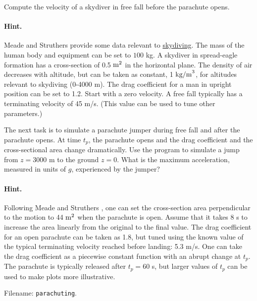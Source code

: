 \documentclass[graybox,sectrefs,envcountresetchap,open=right,final]{svmonodo}
\newenvironment{doconceexercise}{}{}
\begin{document}
\begin{doconceexercise}

Compute the velocity of
a skydiver in free fall before the parachute opens.


\paragraph{Hint.}
Meade and Struthers \cite{parachute_1999} provide some data relevant
to \href{{http://en.wikipedia.org/wiki/Parachuting}}{skydiving}.
The mass of the human body and equipment
can be set to $100$ kg.
A skydiver in spread-eagle formation has a cross-section of 0.5 $\hbox{m}^2$
in the horizontal plane.
The density of air decreases with altitude, but can be taken
as constant, 1 $\hbox{kg/m}^3$, for altitudes relevant to
skydiving (0-4000 m).
The drag coefficient for a man in upright position can be set to 1.2.
Start with a zero velocity.
A free fall typically has a terminating velocity of 45 m/s. (This value
can be used to tune other parameters.)


The next task is to simulate
a parachute jumper during free fall and after the parachute opens.
At time $t_p$, the parachute opens and
the drag coefficient and the cross-sectional
area change dramatically.
Use the program to simulate a jump from $z=3000$ m to the ground $z=0$.
What is the maximum acceleration, measured in units of $g$,
experienced by the jumper?


\paragraph{Hint.}
Following Meade and Struthers \cite{parachute_1999}, one can set the
cross-section area perpendicular to the motion to 44 $\hbox{m}^2$
when the parachute is open. Assume that it takes 8 s to increase
the area linearly from the original to the final value.
The drag coefficient for an open
parachute can be taken as 1.8, but tuned using the known value
of the typical terminating velocity reached before landing:
5.3 m/s. One can take the drag coefficient as a piecewise constant
function with an abrupt change at $t_p$.
The parachute is typically released after $t_p=60$ s, but
larger values of $t_p$ can be used to make plots more illustrative.


\noindent Filename: \texttt{parachuting}.

\end{doconceexercise}
\end{document}
